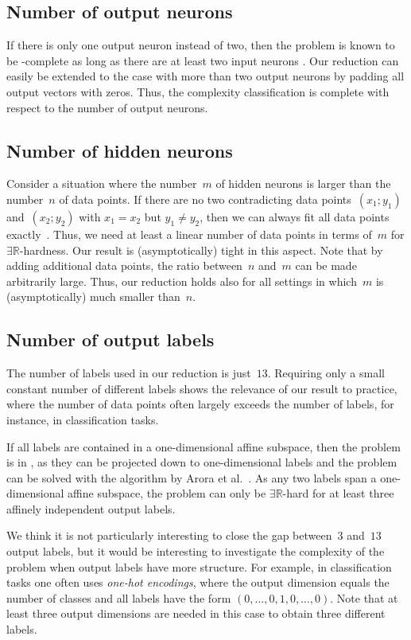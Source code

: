 \documentclass[11pt]{article}
\numberwithin{equation}{section}
\theoremstyle{definition}
\theoremstyle{plain}
\newcommand{\R}{\mathbb R}
\newcommand{\ER}{\texorpdfstring{\ensuremath{\exists\R}}{ER}\xspace}
\theoremstyle{plain}
\begin{document}
\subsection{Number of output neurons}
If there is only one output neuron instead of two, then the problem is known to be \NP-complete
%
as long as there are at least two input neurons \cite{Arora2018_Understanding, Froese2023_FixedDimension}.
%
%
%
%
Our reduction can easily be extended to the case with more than two output neurons by padding all output vectors with zeros.
Thus, the complexity classification is complete with respect to the number of output neurons.

\subsection{Number of hidden neurons}
Consider a situation where the number~$m$ of hidden neurons is larger
than the number~$n$ of data points.
If there are no two contradicting data points~$(x_1; y_1)$ and~$(x_2; y_2)$ with $x_1 = x_2$ but $y_1 \neq y_2$, then we can always fit all data points exactly~\cite{Zhang2021_Understanding}.
Thus, we need at least a linear number of data points in terms of~$m$ for \ER-hardness.
Our result is (asymptotically) tight in this aspect.
Note that by adding additional data points, the ratio between~$n$ and~$m$ can be made arbitrarily large.
Thus, our reduction holds also for all settings in which~$m$ is (asymptotically) much smaller than~$n$.

\subsection{Number of output labels}
The number of labels used in our reduction is just~$13$.
Requiring only a small constant number of different labels shows the relevance of our result to practice, where the number of data points often largely exceeds the number of labels, for instance, in classification tasks.

If all labels are contained in a one-dimensional affine subspace, then the problem is in \NP, as they can be projected down to one-dimensional labels and the problem can be solved with the algorithm by Arora et al.~\cite{Arora2018_Understanding}.
As any two labels span a one-dimensional affine subspace, the problem can only be \ER-hard for at least three affinely independent output labels.

We think it is not particularly interesting to close the gap between~$3$ and~$13$ output labels, but it would be interesting to investigate the complexity of the problem when output labels have more structure.
For example, in classification tasks one often uses \emph{one-hot encodings}, where the output dimension equals the number of classes and all labels have the form $(0, \ldots, 0, 1, 0, \ldots, 0)$.
Note that at least three output dimensions are needed in this case to obtain three different labels.
\end{document}
